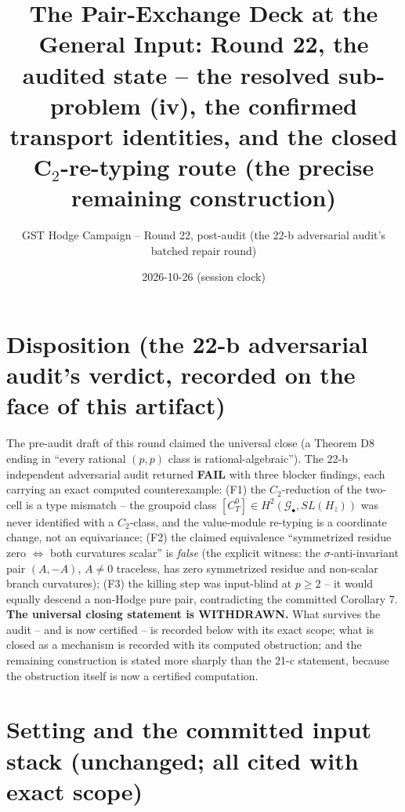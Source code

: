 \documentclass[11pt]{article}
\title{The Pair-Exchange Deck at the General Input: Round 22, the audited state -- the resolved sub-problem (iv), the confirmed transport identities, and the closed C$_2$-re-typing route (the precise remaining construction)}
\author{GST Hodge Campaign -- Round 22, post-audit (the 22-b adversarial audit's batched repair round)}
\date{2026-10-26 (session clock)}
\begin{document}
\maketitle

\section*{Disposition (the 22-b adversarial audit's verdict, recorded on the face of this artifact)}

The pre-audit draft of this round claimed the universal close (a Theorem D8 ending in ``every rational $(p,p)$ class is rational-algebraic''). The 22-b independent adversarial audit returned \textbf{FAIL} with three blocker findings, each carrying an exact computed counterexample: (F1) the $C_2$-reduction of the two-cell is a type mismatch -- the groupoid class $[C_T^0]\in H^2(\mathcal G_\bullet,SL(H_z))$ was never identified with a $C_2$-class, and the value-module re-typing is a coordinate change, not an equivariance; (F2) the claimed equivalence ``symmetrized residue zero $\Leftrightarrow$ both curvatures scalar'' is \emph{false} (the explicit witness: the $\sigma$-anti-invariant pair $(A,-A)$, $A\ne0$ traceless, has zero symmetrized residue and non-scalar branch curvatures); (F3) the killing step was input-blind at $p\ge2$ -- it would equally descend a non-Hodge pure pair, contradicting the committed Corollary 7. \textbf{The universal closing statement is WITHDRAWN.} What survives the audit -- and is now certified -- is recorded below with its exact scope; what is closed as a mechanism is recorded with its computed obstruction; and the remaining construction is stated more sharply than the 21-c statement, because the obstruction itself is now a certified computation.

\section*{Setting and the committed input stack (unchanged; all cited with exact scope)}
\end{document}
